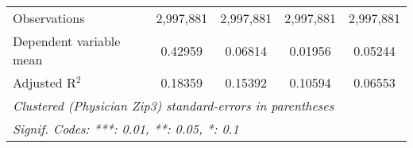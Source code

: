 \begin{table}[htbp]
\begin{threeparttable}[b]
\begin{tabular}{lcccc}
         Observations            & 2,997,881      & 2,997,881      & 2,997,881     & 2,997,881\\  
         Dependent variable mean & 0.42959        & 0.06814        & 0.01956       & 0.05244\\  
         Adjusted R$^2$          & 0.18359        & 0.15392        & 0.10594       & 0.06553\\  
         \midrule \midrule
         \multicolumn{5}{l}{\emph{Clustered (Physician Zip3) standard-errors in parentheses}}\\
         \multicolumn{5}{l}{\emph{Signif. Codes: ***: 0.01, **: 0.05, *: 0.1}}\\
      \end{tabular}
   \end{threeparttable}
\end{table}


